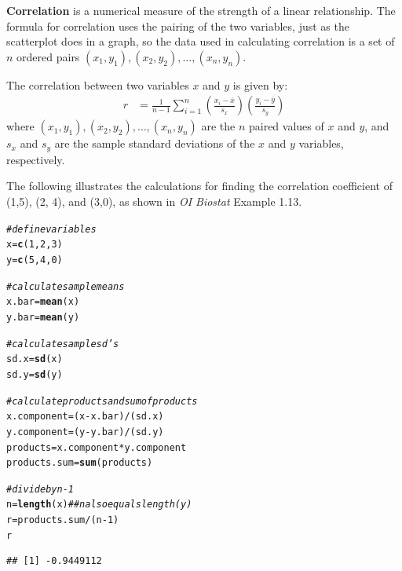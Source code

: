\documentclass{article}\usepackage[]{graphicx}\usepackage[]{color}
\makeatletter
\newcommand{\hlnum}[1]{\textcolor[rgb]{0.686,0.059,0.569}{#1}}%
\newcommand{\hlcom}[1]{\textcolor[rgb]{0.678,0.584,0.686}{\textit{#1}}}%
\newcommand{\hlopt}[1]{\textcolor[rgb]{0,0,0}{#1}}%
\newcommand{\hlstd}[1]{\textcolor[rgb]{0.345,0.345,0.345}{#1}}%
\newcommand{\hlkwb}[1]{\textcolor[rgb]{0.69,0.353,0.396}{#1}}%
\newcommand{\hlkwd}[1]{\textcolor[rgb]{0.737,0.353,0.396}{\textbf{#1}}}%
\newenvironment{kframe}{%
 \def\at@end@of@kframe{}%
 \ifinner\ifhmode%
  \def\at@end@of@kframe{\end{minipage}}%
  \begin{minipage}{\columnwidth}%
 \fi\fi%
 \def\FrameCommand##1{\hskip\@totalleftmargin \hskip-\fboxsep
 \colorbox{shadecolor}{##1}\hskip-\fboxsep
     \hskip-\linewidth \hskip-\@totalleftmargin \hskip\columnwidth}%
 \MakeFramed {\advance\hsize-\width
   \@totalleftmargin\z@ \linewidth\hsize
   \@setminipage}}%
 {\par\unskip\endMakeFramed%
 \at@end@of@kframe}
\newenvironment{knitrout}{}{} %
\makeatother
\begin{document}
\textbf{Correlation} is a numerical measure of the strength of a linear relationship. The formula for correlation uses the pairing of the two variables, just as the scatterplot does in a graph, so the data used in calculating correlation is a set of $n$ ordered pairs $(x_1,y_1), (x_2,y_2), \ldots, (x_n, y_n) $.

The correlation between two variables $x$ and $y$ is given by:
		\begin{align*}
          r &=  \frac{1}{n-1}\sum^{n}_{i=1}
          \left(\frac{x_{i}-\overline{x}}
          {s_{x}}\right)\left(\frac{y_{i}-\overline{y}}{s_{y}}\right)
    \end{align*}      
where $(x_1,y_1), (x_2,y_2), \ldots, (x_n, y_n)$ are the $n$ paired values of $x$ and $y$, and $s_x$ and $s_y$ are the sample standard deviations of the $x$ and $y$ variables, respectively.     

The following illustrates the calculations for finding the correlation coefficient of (1,5), (2, 4), and (3,0), as shown in \textit{OI Biostat} Example 1.13.

\begin{knitrout}
\color{fgcolor}\begin{kframe}
\begin{alltt}
\hlcom{# define variables}
\hlstd{x} \hlkwb{=} \hlkwd{c}\hlstd{(}\hlnum{1}\hlstd{,} \hlnum{2}\hlstd{,} \hlnum{3}\hlstd{)}
\hlstd{y} \hlkwb{=} \hlkwd{c}\hlstd{(}\hlnum{5}\hlstd{,} \hlnum{4}\hlstd{,} \hlnum{0}\hlstd{)}

\hlcom{# calculate sample means}
\hlstd{x.bar} \hlkwb{=} \hlkwd{mean}\hlstd{(x)}
\hlstd{y.bar} \hlkwb{=} \hlkwd{mean}\hlstd{(y)}

\hlcom{# calculate sample sd's}
\hlstd{sd.x} \hlkwb{=} \hlkwd{sd}\hlstd{(x)}
\hlstd{sd.y} \hlkwb{=} \hlkwd{sd}\hlstd{(y)}

\hlcom{# calculate products and sum of products}
\hlstd{x.component} \hlkwb{=} \hlstd{(x} \hlopt{-} \hlstd{x.bar)}\hlopt{/}\hlstd{(sd.x)}
\hlstd{y.component} \hlkwb{=} \hlstd{(y} \hlopt{-} \hlstd{y.bar)}\hlopt{/}\hlstd{(sd.y)}
\hlstd{products} \hlkwb{=} \hlstd{x.component} \hlopt{*} \hlstd{y.component}
\hlstd{products.sum} \hlkwb{=} \hlkwd{sum}\hlstd{(products)}

\hlcom{# divide by n - 1}
\hlstd{n} \hlkwb{=} \hlkwd{length}\hlstd{(x)}   \hlcom{## n also equals length(y)}
\hlstd{r} \hlkwb{=} \hlstd{products.sum} \hlopt{/} \hlstd{(n} \hlopt{-} \hlnum{1}\hlstd{)}
\hlstd{r}
\end{alltt}
\begin{verbatim}
## [1] -0.9449112
\end{verbatim}
\end{kframe}
\end{knitrout}
\end{document}
